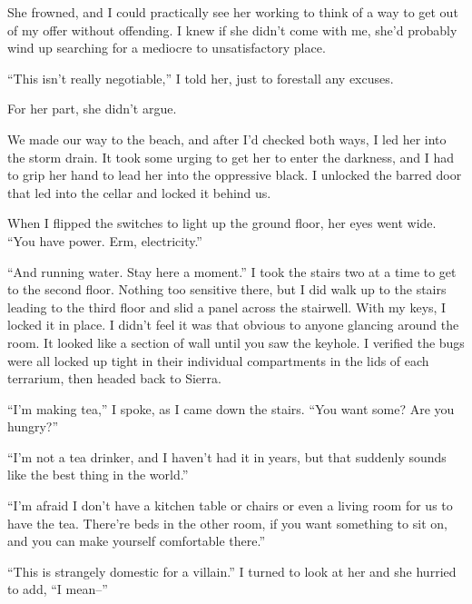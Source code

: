 She frowned, and I could practically see her working to think of a way to get out of my offer without offending.  I knew if she didn't come with me, she'd probably wind up searching for a mediocre to unsatisfactory place.



``This isn't really negotiable,'' I told her, just to forestall any excuses.



For her part, she didn't argue.



We made our way to the beach, and after I'd checked both ways, I led her into the storm drain.  It took some urging to get her to enter the darkness, and I had to grip her hand to lead her into the oppressive black.  I unlocked the barred door that led into the cellar and locked it behind us.



When I flipped the switches to light up the ground floor, her eyes went wide.  ``You have power.  Erm, electricity.''



``And running water.  Stay here a moment.''  I took the stairs two at a time to get to the second floor.  Nothing too sensitive there, but I did walk up to the stairs leading to the third floor and slid a panel across the stairwell.  With my keys, I locked it in place.  I didn't feel it was that obvious to anyone glancing around the room.  It looked like a section of wall until you saw the keyhole.  I verified the bugs were all locked up tight in their individual compartments in the lids of each terrarium, then headed back to Sierra.



``I'm making tea,'' I spoke, as I came down the stairs.  ``You want some?  Are you hungry?''



``I'm not a tea drinker, and I haven't had it in years, but that suddenly sounds like the best thing in the world.''



``I'm afraid I don't have a kitchen table or chairs or even a living room for us to have the tea.  There're beds in the other room, if you want something to sit on, and you can make yourself comfortable there.''



``This is strangely domestic for a villain.''  I turned to look at her and she hurried to add, ``I mean--''



